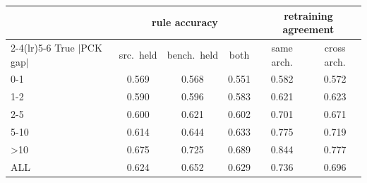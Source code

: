 \begin{tabular}{l ccc cc}
\toprule
 & \multicolumn{3}{c}{rule accuracy} & \multicolumn{2}{c}{retraining agreement} \\
\cmidrule(lr){2-4}\cmidrule(lr){5-6}
True $|$PCK gap$|$ & src.\ held & bench.\ held & both & same arch. & cross arch. \\
\midrule
0-1 & 0.569 & 0.568 & 0.551 & 0.582 & 0.572 \\
1-2 & 0.590 & 0.596 & 0.583 & 0.621 & 0.623 \\
2-5 & 0.600 & 0.621 & 0.602 & 0.701 & 0.671 \\
5-10 & 0.614 & 0.644 & 0.633 & 0.775 & 0.719 \\
>10 & 0.675 & 0.725 & 0.689 & 0.844 & 0.777 \\
ALL & 0.624 & 0.652 & 0.629 & 0.736 & 0.696 \\
\bottomrule
\end{tabular}
